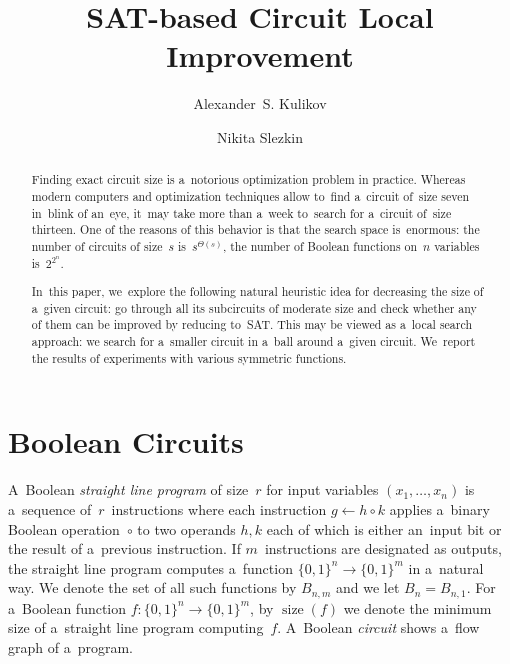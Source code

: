 \documentclass[12pt,letterpaper]{article}
\DeclareMathOperator{\size}{size}
\begin{document}
\sloppy

\title{SAT-based Circuit Local Improvement}
\author{Alexander~S. Kulikov \and Nikita Slezkin}
\maketitle

\begin{abstract}
Finding exact circuit size 
is a~notorious optimization
problem in practice. Whereas modern computers 
and optimization techniques allow to~find a~circuit 
of~size seven in~blink of an~eye, it~may take more 
than a~week to~search for a~circuit of~size thirteen.
One of the reasons of this behavior is that the search 
space is~enormous: the number of circuits of size~$s$ 
is~$s^{\Theta(s)}$, the number of Boolean functions on~$n$ variables is~$2^{2^n}$.

In~this paper, we~explore the following natural
heuristic idea for decreasing the size of
a~given circuit: go through all its subcircuits
of moderate size and check whether 
any of them can be improved by reducing to~SAT. 
This may be viewed
as a~local search approach: we search for a~smaller
circuit in a~ball around a~given circuit.
We~report the results of experiments with various symmetric functions. 
\end{abstract}



\section{Boolean Circuits}
A~Boolean \emph{straight line program} 
of size~$r$ for input variables $(x_1, \dotsc, x_n)$ 
is a~sequence of~$r$~instructions where each 
instruction $g \gets h \circ k$ 
applies a~binary Boolean operation~$\circ$ to 
two operands $h,k$ each of which is either an~input bit 
or the result of a~previous instruction. 
If $m$~instructions are designated as outputs,
the straight line program computes a~function 
$\{0,1\}^n \to \{0,1\}^m$ in a~natural way. 
We denote the set of all such functions by $B_{n,m}$ and we let $B_n=B_{n,1}$.
For 
a~Boolean function $f \colon \{0,1\}^n \to \{0,1\}^m$,
by $\size(f)$ we denote the minimum size of 
a~straight line program
computing~$f$. A~Boolean \emph{circuit} 
shows a~flow graph of a~program.
\end{document}
